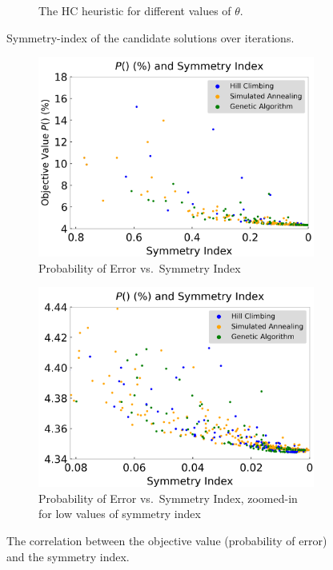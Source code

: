\begin{figure}
\begin{subfigure}[t]{0.49\textwidth}
	\caption{The HC heuristic for different values of $\theta$.}
        \label{fig:symmetry-theta}
    \end{subfigure}
    \caption{Symmetry-index of the candidate solutions over iterations.}
    \label{fig:symmetry-iteration}
\end{figure}

\begin{figure}
    \centering
    \begin{subfigure}[t]{0.49\textwidth}
	\includegraphics[width=\textwidth]{chapters/tqc/figures/poe_symmetry.png}
	\caption{Probability of Error vs.\ Symmetry Index}
        \label{fig:poe_symmetry}
    \end{subfigure}
    \qquad
    \hspace{-0.3in}
    \begin{subfigure}[t]{0.49\textwidth}
	\includegraphics[width=\textwidth]{chapters/tqc/figures/poe_symmetry_zoomin.png}
	\caption{Probability of Error vs.\ Symmetry Index, zoomed-in for low values of symmetry index}
        \label{fig:poe_symmetry_zoom}
    \end{subfigure}
    \caption{The correlation between the objective value (probability of error) and the symmetry index.}
\end{figure}

